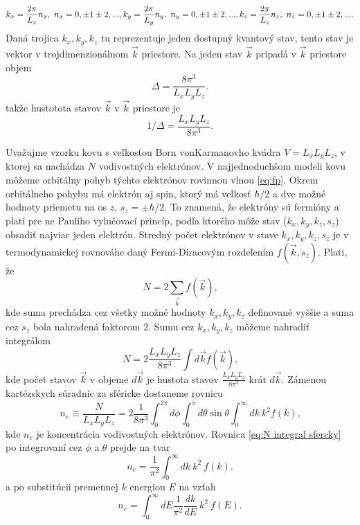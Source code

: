 \begin{equation}
 k_x=\frac{2\pi}{L_x}n_x , \   n_x=0,\pm 1 \pm 2, ...\\, k_y=\frac{2\pi}{L_y}n_y ,  \  n_y=0,\pm 1 \pm 2, ...\\, k_z=\frac{2\pi}{L_z}n_z , \  n_z=0,\pm 1 \pm 2, ... \text{.}
\end{equation}
Daná trojica ${k_x, k_y, k_z}$ tu reprezentuje jeden dostupný kvantový stav,
tento stav je vektor v trojdimenzionálnom $\vec k$ priestore.
Na jeden stav $\vec k$ pripadá v $\vec k$ priestore objem
\begin{equation}
\label{eq:V}
\Delta =\frac{8\pi^3}{L_xL_yL_z}\text{.}
\end{equation}
takže
hustotota stavov $\vec k$ v $\vec k$ priestore je
\begin{equation}
\label{eq:V otocene}
1/\Delta =\frac{L_xL_yL_z}{8\pi^3}  \text{.}
\end{equation}

Uvažujme vzorku kovu s veľkosťou Born vonKarmanovho kvádra $V = L_xL_yL_z$, v ktorej sa nachádza $N$ vodivostných elektrónov. V najjednoduchšom modeli kovu
môžeme orbitálny pohyb týchto elektrónov rovinnou vlnou \eqref{eq:fp}.
Okrem orbitálneho pohybu má elektrón aj spin, ktorý má veľkosť $\hbar/2$ a dve možné hodnoty priemetu na os ${z}$,
 $s_z = \pm \hbar/2$. To znamená, že elektróny sú fermióny a platí pre ne Pauliho vylučovací princíp, podľa ktorého môže
stav ($k_x, k_y, k_z, s_z$) obsadiť najviac jeden elektrón. Stredný počet elektrónov v stave ${k_x, k_y, k_z, s_z}$ je v termodynamickej rovnováhe daný Fermi-Diracovým rozdelením
$f(\vec k, s_z)$. Plati, že
\begin{equation}
 \label{eq:N}
 N = 2 \sum_{\vec k} f(\vec k)  \text{,}
\end{equation}
kde suma prechádza cez všetky možné hodnoty ${k_x, k_y, k_z}$ definované vyššie
a suma cez ${s_z}$ bola nahradená faktorom $2$. Sumu cez
${k_x, k_y, k_z}$ môžeme nahradiť integrálom
\begin{equation}
 \label{eq:N integral}
 N = 2 \frac{L_xL_yL_z}{8\pi^3} \int d \vec k f(\vec k)  \text{,}
\end{equation}
kde počet stavov $\vec k$ v objeme
 $d \vec k$ je hustota stavov $\frac{L_xL_yL_z}{8\pi^3}$ krát $d \vec k$.
Zámenou kartézskych súradníc za sféricke dostaneme rovnicu
\begin{equation}
 \label{eq:N integral sfercky}
 n_e \equiv \frac{N}{L_xL_yL_z} = 2 \frac{1}{8\pi^3} \int_0^{2\pi} d\phi \int_0^{\pi}  d\theta \sin{\theta} \int_0^{\infty} dk\ k^2 f(k)  \text{,}
\end{equation}
kde $n_e$ je koncentrácia vodivostných elektrónov. Rovnica  \eqref{eq:N integral sfercky}
po integrovaní cez $\phi$ a $\theta$ prejde na tvar
\begin{equation}
 \label{eq:N integral sfer k}
 n_e =   \frac{1}{\pi^2} \int_0^{\infty} dk \ k^2 \ f(k)  \text{.}
\end{equation}
a po substitúcii premennej $k$ energiou $E$ na vzťah
\begin{equation}
 \label{eq:N integral sfer energ}
 n_e =   \int_0^{\infty} dE \frac{1}{\pi^2}  \frac{dk}{dE} \ k^2 \ f(E)  \text{.}
\end{equation}

